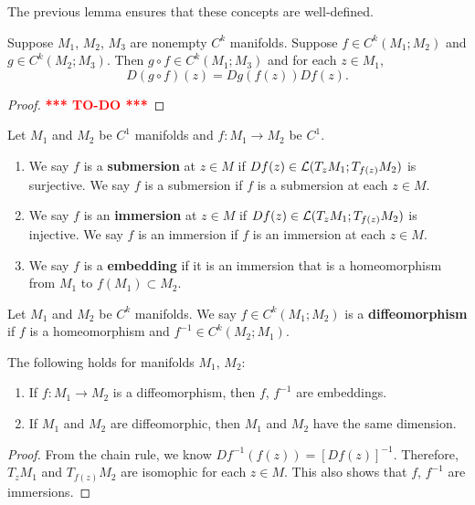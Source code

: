 \documentclass[a4paper]{article}
\newcommand{\TODO}{\textcolor{red}{\textbf{*** TO-DO ***}}}
\begin{document}
The previous lemma ensures that these concepts are well-defined.

\begin{thm}
  Suppose $M_1$, $M_2$, $M_3$ are nonempty $C^k$ manifolds.
  Suppose $f \in C^k(M_1; M_2)$ and $g \in C^k(M_2; M_3)$.
  Then $g \circ f \in C^k (M_1; M_3)$ and for each $z \in M_1$,
  \[
    D (g \circ f)(z) = D g (f(z)) D f(z).
  \]
\end{thm}

\begin{proof}
  \TODO
\end{proof}

\begin{defi}
  Let $M_1$ and $M_2$ be $C^1$ manifolds and $f: M_1 \to M_2$ be $C^1$.
  \begin{enumerate}
    \item We say $f$ is a \textbf{submersion} at $z \in M$ if $Df(z) \in
          \mathcal{L}(T_z M_1 ; T_{f(z)} M_2)$ is surjective. We say $f$ is a
          submersion if $f$ is a submersion at each $z \in M$.
    \item We say $f$ is an \textbf{immersion} at $z \in M$ if $Df(z) \in
          \mathcal{L}(T_z M_1 ; T_{f(z)} M_2)$ is injective. We say $f$ is an
          immersion if $f$ is an immersion at each $z \in M$.
    \item We say $f$ is a \textbf{embedding} if it is an immersion that is
          a homeomorphism from $M_1$ to $f(M_1) \subset M_2$.
  \end{enumerate}
\end{defi}

\begin{defi}[diffeomorphism]
  Let $M_1$ and $M_2$ be $C^k$ manifolds. We say $f \in
    C^k(M_1; M_2)$ is a \textbf{diffeomorphism} if $f$ is a
  homeomorphism and $f^{-1} \in C^k(M_2; M_1)$.
\end{defi}

\begin{prop}
  The following holds for manifolds $M_1$, $M_2$:
  \begin{enumerate}
    \item If $f: M_1 \to M_2$ is a diffeomorphism, then $f$, $f^{-1}$ are
          embeddings.
    \item If $M_1$ and $M_2$ are diffeomorphic, then $M_1$ and $M_2$ have
          the same dimension.
  \end{enumerate}
\end{prop}

\begin{proof}
  From the chain rule, we know $Df^{-1}(f(z)) = [Df(z)]^{-1}$. Therefore,
  $T_z M_1$ and $T_{f(z)} M_2$ are isomophic for each $z \in M$. This also
  shows that $f$, $f^{-1}$ are immersions.
\end{proof}
\end{document}
